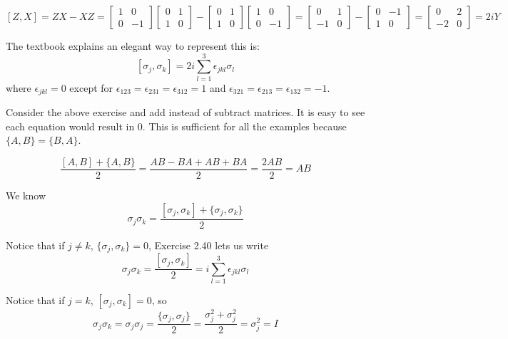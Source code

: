 $$[Z, X] = ZX - XZ = \begin{bmatrix}
1 & 0 \\
0 & -1
\end{bmatrix} \begin{bmatrix}
0 & 1 \\
1 & 0
\end{bmatrix} - \begin{bmatrix}
0 & 1 \\
1 & 0
\end{bmatrix} \begin{bmatrix}
1 & 0 \\
0 & -1
\end{bmatrix} = \begin{bmatrix}
0 & 1 \\
-1 & 0
\end{bmatrix} - \begin{bmatrix}
 0 & -1 \\
 1 & 0
\end{bmatrix} = \begin{bmatrix}
0 & 2 \\
-2 & 0
\end{bmatrix} = 2iY$$

The textbook explains an elegant way to represent this is:
$$[ \sigma_{j}, \sigma_{k} ] = 2i \sum_{l = 1}^{3} \epsilon_{jkl} \sigma_{l}$$
where $\epsilon_{jkl} = 0$ except for $\epsilon_{123} = \epsilon_{231} = \epsilon_{312} = 1$ and $\epsilon_{321} = \epsilon_{213} = \epsilon_{132} = -1$. 

\exercise
Consider the above exercise and add instead of subtract matrices. It is easy to see each equation would result in 0. This is sufficient for all the examples because $\{ A, B \} = \{ B, A \}$. 

\exercise
$$\frac{[A, B] + \{A, B \}}{2} = \frac{AB - BA + AB + BA}{2} = \frac{2AB}{2} = AB$$

\exercise
We know $$\sigma_{j} \sigma_{k} = \frac{[\sigma_{j}, \sigma_{k}] + \{ \sigma_{j}, \sigma_{k} \}}{2}$$

Notice that if $j \neq k$, $\{ \sigma_{j}, \sigma_{k} \} = 0$, Exercise 2.40 lets us write
$$\sigma_{j} \sigma_{k} = \frac{[\sigma_{j}, \sigma_{k}]}{2} = i \sum_{l=1}^{3} \epsilon_{jkl} \sigma_{l}$$

Notice that if $j = k$, $[\sigma_{j}, \sigma_{k}] = 0$, so
$$\sigma_{j} \sigma_{k} = \sigma_{j} \sigma_{j} = \frac{\{\sigma_{j}, \sigma_{j} \}}{2} = \frac{\sigma_{j}^{2} + \sigma_{j}^{2}}{2} = \sigma_{j}^{2} = I$$

